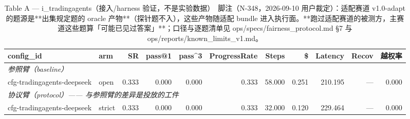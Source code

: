 \begin{table}[t]
\centering
\caption{Table A — i\_tradingagents（接入/harness 验证，不是实验数据）　脚注（N-348，2026-09-10 用户裁定）：适配赛道 v1.0-adapt 的题源是**出集规定题的 oracle 产物**（探针题不入），这些产物随适配 bundle 进入执行面。**跑过适配赛道的被测方，主赛道这些题算「可能已见过答案」**；口径与逐题清单见 ops/specs/fairness\_protocol.md §7 与 ops/reports/known\_limits\_v1.md。}
\label{tab:a-i_tradingagents}
\begin{tabular}{llrrrrrrrrr}
\toprule
config\_id & arm & SR & pass@1 & pass\^{}3 & ProgressRate & Steps & \$ & Latency & Recov & 越权率 \\
\midrule
\multicolumn{11}{l}{\textit{参照臂（baseline）}} \\
cfg-tradingagents-deepseek & open & 0.333 & 0.000 & 0.000 & 0.333 & 58.000 & 0.251 & 210.195 & --- & 0.000 \\
\midrule
\multicolumn{11}{l}{\textit{协议臂（protocol）—— 与参照臂的差异是投放的工件}} \\
cfg-tradingagents-deepseek & strict & 0.333 & 0.000 & 0.000 & 0.333 & 32.000 & 0.120 & 229.464 & --- & 0.000 \\
\bottomrule
\end{tabular}
\end{table}

